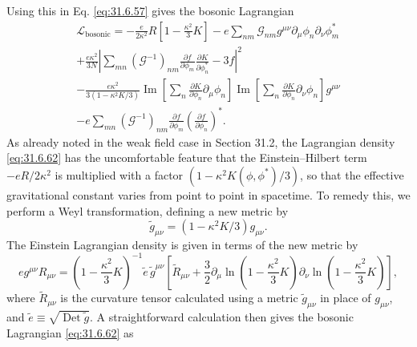 Using this in Eq. \eqref{eq:31.6.57} gives the bosonic Lagrangian
\begin{multline}
  \mathcal L_{\mathrm{bosonic}}
  =-\frac{e}{2\kappa^2}R
    \left[1-\frac{\kappa^2}{3}K\right]
  -e\sum_{nm}\mathcal G_{nm}g^{\mu\nu}
    \partial_\mu\phi_n\partial_\nu\phi_m^*\\
  +\frac{e\kappa^2}{3N}
    \left|
      \sum_{mn}(\mathcal G^{-1})_{nm}
      \frac{\partial f}{\partial\phi_m}
      \frac{\partial K}{\partial\phi_n^*}
      -3f
    \right|^2\\
  -\frac{e\kappa^2}{3(1-\kappa^2K/3)}
    \operatorname{Im}\left[
      \sum_n\frac{\partial K}{\partial\phi_n}\partial_\mu\phi_n
    \right]
    \operatorname{Im}\left[
      \sum_n\frac{\partial K}{\partial\phi_n}\partial_\nu\phi_n
    \right]g^{\mu\nu}\\
  -e\sum_{mn}(\mathcal G^{-1})_{nm}
    \frac{\partial f}{\partial\phi_m}
    \left(\frac{\partial f}{\partial\phi_n}\right)^*.
  \tag{31.6.62}\label{eq:31.6.62}
\end{multline}
As already noted in the weak field case in Section 31.2, the Lagrangian
density \eqref{eq:31.6.62} has the uncomfortable feature that the
Einstein--Hilbert term \(-eR/2\kappa^2\) is multiplied with a factor
\((1-\kappa^2K(\phi,\phi^*)/3)\), so that the effective gravitational
constant varies from point to point in spacetime. To remedy this, we
perform a Weyl transformation, defining a new metric by
\begin{equation}
  \widetilde g_{\mu\nu}
  =(1-\kappa^2K/3)g_{\mu\nu}.
  \tag{31.6.63}\label{eq:31.6.63}
\end{equation}
The Einstein Lagrangian density is given in terms of the new metric by
\[
  eg^{\mu\nu}R_{\mu\nu}
  =\left(1-\frac{\kappa^2}{3}K\right)^{-1}
    \widetilde e\,\widetilde g^{\mu\nu}
    \left[
      \widetilde R_{\mu\nu}
      +\frac{3}{2}\partial_\mu
        \ln\left(1-\frac{\kappa^2}{3}K\right)
        \partial_\nu
        \ln\left(1-\frac{\kappa^2}{3}K\right)
    \right],
\]
where \(\widetilde R_{\mu\nu}\) is the curvature tensor calculated using
a metric \(\widetilde g_{\mu\nu}\) in place of \(g_{\mu\nu}\), and
\(\widetilde e\equiv\sqrt{\operatorname{Det}\widetilde g}\). A
straightforward calculation then gives the bosonic Lagrangian
\eqref{eq:31.6.62} as
